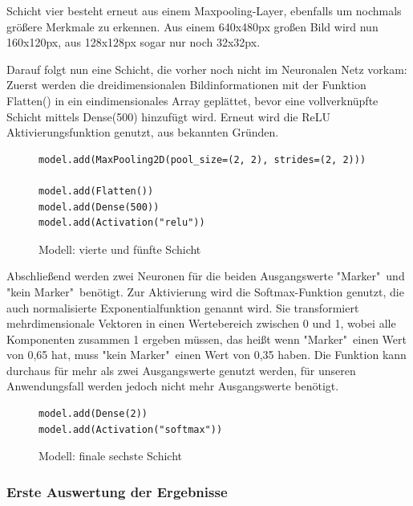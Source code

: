 \documentclass[conference]{IEEEtran}
\begin{document}
	
	Schicht vier besteht erneut aus einem Maxpooling-Layer, ebenfalls um nochmals größere Merkmale zu erkennen.
	Aus einem 640x480px großen Bild wird nun 160x120px, aus 128x128px sogar nur noch 32x32px.
	
	Darauf folgt nun eine Schicht, die vorher noch nicht im Neuronalen Netz vorkam:
	Zuerst werden die dreidimensionalen Bildinformationen mit der Funktion 
	Flatten() in ein eindimensionales Array geplättet, bevor eine 
	vollverknüpfte Schicht mittels Dense(500) hinzufügt wird.
	Erneut wird die ReLU Aktivierungsfunktion genutzt, aus bekannten 
	Gründen.
	
	\begin{figure}[!h]
		\centering
		\begin{verbatim}
model.add(MaxPooling2D(pool_size=(2, 2), strides=(2, 2)))

model.add(Flatten())
model.add(Dense(500))
model.add(Activation("relu"))
		\end{verbatim}
		\caption{Modell: vierte und fünfte Schicht}
		\label{Schicht vier und fünf}
	\end{figure}
	
	Abschließend werden zwei Neuronen für die beiden Ausgangswerte 
	"Marker"\ und "kein Marker"\ benötigt.
	Zur Aktivierung wird die Softmax-Funktion genutzt, die auch 
	normalisierte Exponentialfunktion genannt wird.
	Sie transformiert mehrdimensionale Vektoren in einen Wertebereich zwischen 0 und 1, wobei alle Komponenten zusammen 1 ergeben müssen, das heißt wenn "Marker"\ einen Wert von 0,65 hat, muss "kein Marker"\ einen Wert von 0,35 haben. 
	Die Funktion kann durchaus für mehr als zwei Ausgangswerte genutzt werden, für unseren Anwendungsfall werden jedoch nicht mehr Ausgangswerte benötigt.
	
	\begin{figure}[!h]
		\centering
		\begin{verbatim}
model.add(Dense(2))
model.add(Activation("softmax"))
		\end{verbatim}
		\caption{Modell: finale sechste Schicht}
		\label{Schicht sechs}
	\end{figure}

	\subsubsection{Erste Auswertung der Ergebnisse}	%
\end{document}
